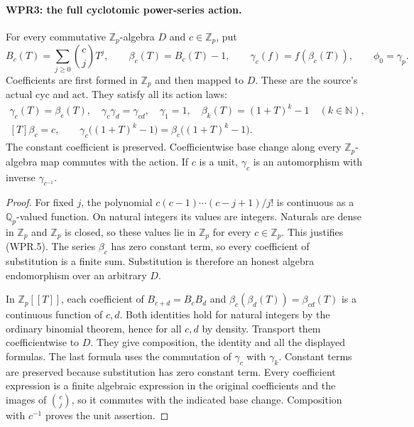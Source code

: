 \documentclass[11pt,a4paper]{article}
\numberwithin{equation}{section}
\theoremstyle{remark}\newtheorem{remark}[theorem]{Remark}
\begin{document}
\paragraph{WPR3: the full cyclotomic power-series action.}
\label{claim:WPR3}
For every commutative $\mathbb Z_p$-algebra $D$ and $c\in\mathbb Z_p$,
put
\[
 B_c(T)=\sum_{j\geq0}\binom cjT^j,\qquad
 \beta_c(T)=B_c(T)-1,\qquad
 \gamma_c(f)=f(\beta_c(T)),\qquad \phi_0=\gamma_p.
 \tag{WPR.5}
\]
Coefficients are first formed in $\mathbb Z_p$ and then mapped
to $D$. These are the source's actual $\mathrm{cyc}$ and
$\mathrm{act}$. They satisfy all its action laws:
\[
 \begin{gathered}
 \gamma_c(T)=\beta_c(T),\quad
 \gamma_c\gamma_d=\gamma_{cd},\quad \gamma_1=1,\quad
 \beta_k(T)=(1+T)^k-1\quad(k\in\mathbb N),\\
 [T]\beta_c=c,\qquad
 \gamma_c\big((1+T)^k-1\big)
       =\beta_c\big((1+T)^k-1\big).
 \end{gathered}                                                     \tag{WPR.6}
\]
The constant coefficient is preserved. Coefficientwise base change
along every $\mathbb Z_p$-algebra map commutes with the action.
If $c$ is a unit, $\gamma_c$ is an automorphism with inverse
$\gamma_{c^{-1}}$.

\begin{proof}
For fixed $j$, the polynomial $c(c-1)\cdots(c-j+1)/j!$ is
continuous as a $\mathbb Q_p$-valued function. On natural integers
its values are integers. Naturals are dense in $\mathbb Z_p$ and
$\mathbb Z_p$ is closed, so these values lie in $\mathbb Z_p$
for every $c\in\mathbb Z_p$. This justifies (WPR.5).
The series $\beta_c$ has zero constant term, so every coefficient
of substitution is a finite sum. Substitution is therefore an
honest algebra endomorphism over an arbitrary $D$.

In $\mathbb Z_p[[T]]$, each coefficient of
$B_{c+d}=B_cB_d$ and $\beta_c(\beta_d(T))=\beta_{cd}(T)$ is a
continuous function of $c,d$. Both identities hold for natural
integers by the ordinary binomial theorem, hence for all $c,d$
by density. Transport them coefficientwise to $D$. They give
composition, the identity and all the displayed formulas. The
last formula uses the commutation of $\gamma_c$ with $\gamma_k$.
Constant terms are preserved because substitution has zero
constant term. Every coefficient expression is a finite algebraic
expression in the original coefficients and the images of
$\binom cj$, so it commutes with the indicated base change.
Composition with $c^{-1}$ proves the unit assertion.
\end{proof}
\end{document}
